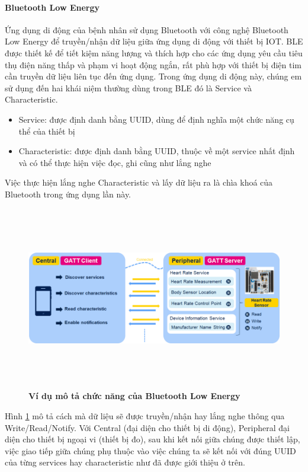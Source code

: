 \paragraph{Bluetooth Low Energy}
\mbox{}

Ứng dụng di động của bệnh nhân sử dụng Bluetooth với công nghệ Bluetooth Low Energy để truyền/nhận dữ liệu giữa ứng dụng di
động với thiết bị IOT. BLE được thiết kế để tiết kiệm năng lượng và thích hợp cho các ứng dụng yêu cầu tiêu thụ điện năng thấp 
và phạm vi hoạt động ngắn, rất phù hợp với thiết bị điện tim cần truyền dữ liệu liên tục đến ứng dụng. Trong ứng dụng di động này, chúng
em sử dụng đến hai khái niệm thường dùng trong BLE đó là Service và Characteristic.


\begin{itemize} 
  \item Service: được định danh bằng UUID, dùng để định nghĩa một chức năng cụ thể của thiết bị
  \item Characteristic: được định danh bằng UUID, thuộc về một service nhất định và có thể thực hiện việc đọc, ghi cũng như lắng nghe
\end{itemize}

Việc thực hiện lắng nghe Characteristic và lấy dữ liệu ra là chìa khoá của Bluetooth trong ứng dụng lần này.
  \begin{figure}[H]
        \centering
        \includegraphics[width=16cm,height=8cm]{Images/system/ble_services.png}
        \caption[Ví dụ mô tả chức năng của Bluetooth Low Energy]{\bfseries \fontsize{12pt}{0pt}
        \selectfont Ví dụ mô tả chức năng của Bluetooth Low Energy}
        \label{ble_services} %
  \end{figure}

  Hình \ref{ble_services} mô tả cách mà dữ liệu sẽ được truyền/nhận hay lắng nghe thông qua Write/Read/Notify. 
  Với Central (đại diện cho thiết bị di động), Peripheral đại diện cho thiết bị ngoại vi (thiết bị đo), sau khi kết nối giữa chúng 
  được thiết lập, việc giao tiếp giữa chúng phụ thuộc vào việc chúng ta sẽ kết nối với đúng UUID của từng services hay
  characteristic như đã được giới thiệu ở trên.

